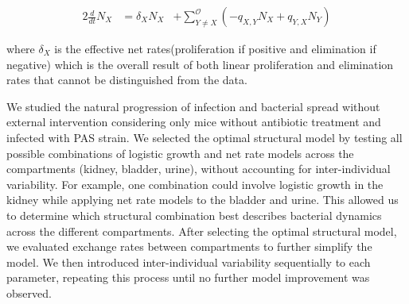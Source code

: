 \documentclass{article}
\begin{document}


\begin{alignat}{2}
\frac{d}{dt} N_{X} &=  \delta_X N_{X} & + \sum_{Y \neq X}^{\mathcal{O} } \left( -q_{X,Y} N_{X} + q_{Y, X} N_{Y} \right)
\label{eq:ODEeffect}
\end{alignat}





where $\delta_X$ is the effective net rates(proliferation if positive and elimination if negative) which is the overall result of both linear proliferation and elimination rates that cannot be distinguished from the data.




We studied the natural progression of infection and bacterial spread without external intervention considering only mice without antibiotic treatment and infected with PAS strain. We selected the optimal structural model by testing all possible combinations of logistic growth and net rate models across the compartments (kidney, bladder, urine), without accounting for inter-individual variability. For example, one combination could involve logistic growth in the kidney while applying net rate models to the bladder and urine. This allowed us to determine which structural combination best describes bacterial dynamics across the different compartments.
%
After selecting the optimal structural model, we evaluated exchange rates between compartments to further simplify the model. We then introduced inter-individual variability sequentially to each parameter, repeating this process until no further model improvement was observed.
\end{document}
